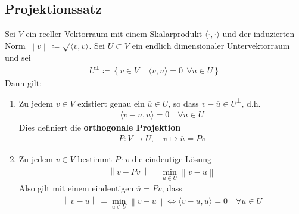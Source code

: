\documentclass[ngerman,fontsize=11pt, paper=a4, parskip=half, titlepage=true, toc=bib]{scrbook}
\newcommand{\nn}[1]{\left\| #1 \right\|}
\newcommand{\scp}[2]{\langle #1, #2 \rangle}
\begin{document}
  \subsection{Projektionssatz}  \label{4.3.3}
  Sei $V$ ein reeller Vektorraum mit einem Skalarprodukt $\scp{\cdot}{\cdot}$
  und der induzierten Norm $\nn{v}\coloneqq \sqrt{\scp{v}{v}}$.
  Sei $U\subset V$ ein endlich dimensionaler Untervektorraum und sei
  \begin{gather*}
    U^\bot \coloneqq \left\{ v\in V  \, \middle\vert \, \scp{v}{u} = 0 ~~ \forall u\in U \right\}
  \end{gather*}
  Dann gilt:
  \begin{enumerate}[1)]
  \item Zu jedem $v\in V$ existiert genau ein $\overline{u}\in U$, 
    so dass $v-\overline{u}\in U^\bot$, d.h.
    \begin{gather*}
      \scp{v-\overline{u}}{u} = 0 \quad \forall u \in U
    \end{gather*}
    Dies definiert die \textbf{orthogonale Projektion} 
    \begin{gather*}
      P:V\rightarrow U, \quad v\mapsto \overline{u}= Pv
    \end{gather*}
  \item Zu jedem $v\in V $ bestimmt $P\cdot v$ die eindeutige Lösung
    \begin{gather*}
      \nn{v-Pv}= \min_{u\in U} \nn{v-u}
    \end{gather*}
    Also gilt mit einem eindeutigen $\overline{u}= Pv$, dass 
    \begin{gather}
      \nn{v-\overline{u}} = \min_{u\in U} \nn{v-u} 
      \Longleftrightarrow \scp{v-\overline{u}}{u} = 0 \quad \forall u\in U
      \label{IV.3.3}
    \end{gather}
  \end{enumerate}
  
\end{document}
